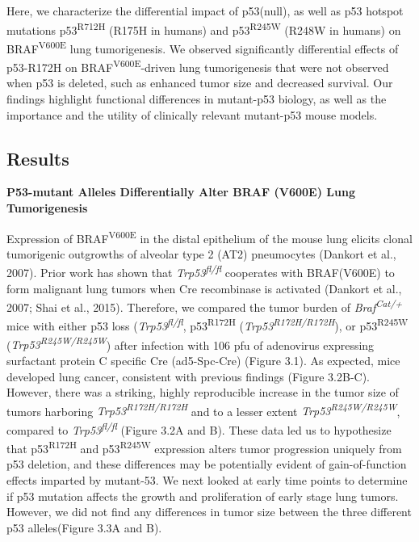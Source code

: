 Here, we characterize the differential impact of p53(null), as well as p53 hotspot mutations p53\textsuperscript{R712H} (R175H in humans) and p53\textsuperscript{R245W} (R248W in humans) on BRAF\textsuperscript{V600E} lung tumorigenesis. We observed significantly differential effects of p53-R172H on BRAF\textsuperscript{V600E}-driven lung tumorigenesis that were not observed when p53 is deleted, such as enhanced tumor size and decreased survival. Our findings highlight functional differences in mutant-p53 biology, as well as the importance and the utility of clinically relevant mutant-p53 mouse models.

\hypertarget{results-1}{%
\subsection{Results}\label{results-1}}

\textbf{P53-mutant Alleles Differentially Alter BRAF (V600E) Lung Tumorigenesis}

Expression of BRAF\textsuperscript{V600E} in the distal epithelium of the mouse lung elicits clonal tumorigenic outgrowths of alveolar type 2 (AT2) pneumocytes (Dankort et al., 2007). Prior work has shown that \emph{Trp53\textsuperscript{fl/fl}} cooperates with BRAF(V600E) to form malignant lung tumors when Cre recombinase is activated (Dankort et al., 2007; Shai et al., 2015). Therefore, we compared the tumor burden of \emph{Braf\textsuperscript{Cat/+}} mice with either p53 loss (\emph{Trp53\textsuperscript{fl/fl}}, p53\textsuperscript{R172H} (\emph{Trp53\textsuperscript{R172H/R172H}}), or p53\textsuperscript{R245W} (\emph{Trp53\textsuperscript{R245W/R245W}}) after infection with 106 pfu of adenovirus expressing surfactant protein C specific Cre (ad5-Spc-Cre) (Figure 3.1). As expected, mice developed lung cancer, consistent with previous findings (Figure 3.2B-C). However, there was a striking, highly reproducible increase in the tumor size of tumors harboring \emph{Trp53\textsuperscript{R172H/R172H}} and to a lesser extent \emph{Trp53\textsuperscript{R245W/R245W}}, compared to \emph{Trp53\textsuperscript{fl/fl}} (Figure 3.2A and B). These data led us to hypothesize that p53\textsuperscript{R172H} and p53\textsuperscript{R245W} expression alters tumor progression uniquely from p53 deletion, and these differences may be potentially evident of gain-of-function effects imparted by mutant-53. We next looked at early time points to determine if p53 mutation affects the growth and proliferation of early stage lung tumors. However, we did not find any differences in tumor size between the three different p53 alleles(Figure 3.3A and B).

